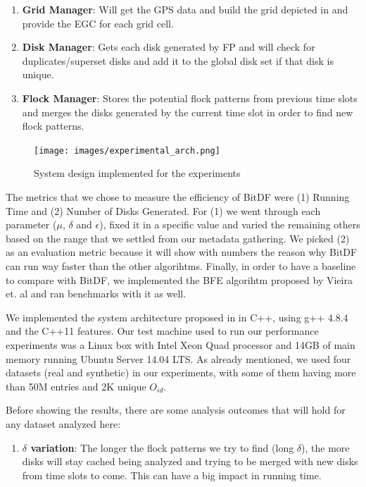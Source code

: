 {\begin{enumerate}
    \item \textbf{Grid Manager}: Will get the GPS data and build the grid depicted in  and provide the
        EGC for each grid cell.
    \item \textbf{Disk Manager}: Gets each disk generated by FP and will check for duplicates/superset disks and add it
        to the global disk set if that disk is unique.
    \item \textbf{Flock Manager}: Stores the potential flock patterns from previous time slots and merges the disks
        generated by the current time slot in order to find new flock patterns.
\end{enumerate}

\begin{figure}[h!]
    \centering
    \texttt{[image: images/experimental\_arch.png]}
    \caption{System design implemented for the experiments}
    \label{fig:experimental_arch}
\end{figure}

The metrics that we chose to measure the efficiency of BitDF were (1) Running Time and (2) Number of Disks Generated.
For (1) we went through each parameter ($\mu$, $\delta$ and $\epsilon$), fixed it in a specific value and varied the
remaining others based on the range that we settled from our metadata gathering. We picked (2) as an evaluation metric
because it will show with numbers the reason why BitDF can run way faster than the other algorihtms. Finally, in order
to have a baseline to compare with BitDF, we implemented the BFE algorihtm proposed by Vieira et. al \citep{vieira} and
ran benchmarks with it as well.

We implemented the system architecture proposed in  in C++, using g++ 4.8.4 and the C++11
\citep{cpp11spec} features. Our test machine used to run our performance experiments was a Linux box with Intel Xeon
Quad processor and 14GB of main memory running Ubuntu Server 14.04 LTS. As already mentioned, we used four datasets
(real and synthetic) in our experiments, with some of them having more than 50M entries and 2K unique $O_{id}$.

Before showing the results, there are some analysis outcomes that will hold for any dataset analyzed here:

\begin{enumerate}
    \item \textbf{$\delta$ variation}: The longer the flock patterns we try to find (long $\delta$), the more disks will
        stay cached being analyzed and trying to be merged with new disks from time slots to come. This can have a big
        impact in running time.\label{sssec:lvariation}


\end{enumerate}}
